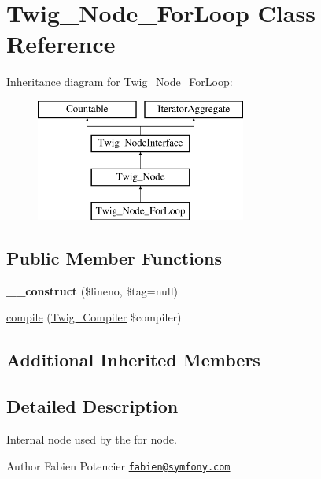 \hypertarget{classTwig__Node__ForLoop}{}\section{Twig\+\_\+\+Node\+\_\+\+For\+Loop Class Reference}
\label{classTwig__Node__ForLoop}
Inheritance diagram for Twig\+\_\+\+Node\+\_\+\+For\+Loop\+:\begin{figure}[H]
\begin{center}
\leavevmode
\includegraphics[height=4.000000cm]{classTwig__Node__ForLoop}
\end{center}
\end{figure}
\subsection*{Public Member Functions}
\begin{DoxyCompactItemize}
\item 
{\bfseries \+\_\+\+\_\+construct} (\$lineno, \$tag=null)\hypertarget{classTwig__Node__ForLoop_a99da0b8dbb9feff6142e208a496f41a1}{}\label{classTwig__Node__ForLoop_a99da0b8dbb9feff6142e208a496f41a1}

\item 
\hyperlink{classTwig__Node__ForLoop_af8309ab127b78a9050b332334ca2c290}{compile} (\hyperlink{classTwig__Compiler}{Twig\+\_\+\+Compiler} \$compiler)
\end{DoxyCompactItemize}
\subsection*{Additional Inherited Members}


\subsection{Detailed Description}
Internal node used by the for node.

\begin{DoxyAuthor}{Author}
Fabien Potencier \href{mailto:fabien@symfony.com}{\tt fabien@symfony.\+com} 
\end{DoxyAuthor}


